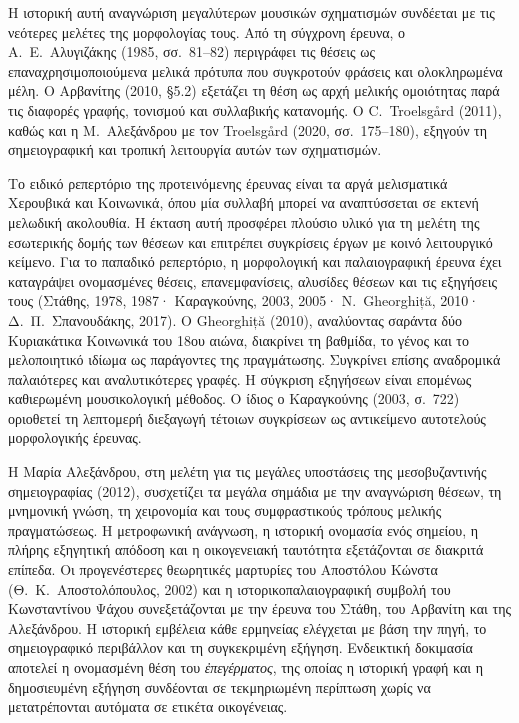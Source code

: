 \documentclass[11pt,a4paper]{article}
\begin{document}
Η ιστορική αυτή αναγνώριση μεγαλύτερων μουσικών σχηματισμών συνδέεται με τις νεότερες μελέτες της μορφολογίας τους. Από τη σύγχρονη έρευνα, ο Α.~Ε.~Αλυγιζάκης (1985, σσ.~81--82) περιγράφει τις θέσεις ως επαναχρησιμοποιούμενα μελικά πρότυπα που συγκροτούν φράσεις και ολοκληρωμένα μέλη. Ο Αρβανίτης (2010, §5.2) εξετάζει τη θέση ως αρχή μελικής ομοιότητας παρά τις διαφορές γραφής, τονισμού και συλλαβικής κατανομής. Ο C.~Troelsgård (2011), καθώς και η Μ.~Αλεξάνδρου με τον Troelsgård (2020, σσ.~175--180), εξηγούν τη σημειογραφική και τροπική λειτουργία αυτών των σχηματισμών.

Το ειδικό ρεπερτόριο της προτεινόμενης έρευνας είναι τα αργά μελισματικά Χερουβικά και Κοινωνικά, όπου μία συλλαβή μπορεί να αναπτύσσεται σε εκτενή μελωδική ακολουθία. Η έκταση αυτή προσφέρει πλούσιο υλικό για τη μελέτη της εσωτερικής δομής των θέσεων και επιτρέπει συγκρίσεις έργων με κοινό λειτουργικό κείμενο. Για το παπαδικό ρεπερτόριο, η μορφολογική και παλαιογραφική έρευνα έχει καταγράψει ονομασμένες θέσεις, επανεμφανίσεις, αλυσίδες θέσεων και τις εξηγήσεις τους (Στάθης, 1978, 1987· Καραγκούνης, 2003, 2005· N.~Gheorghiță, 2010· Δ.~Π.~Σπανουδάκης, 2017). Ο Gheorghiță (2010), αναλύοντας σαράντα δύο Κυριακάτικα Κοινωνικά του 18ου αιώνα, διακρίνει τη βαθμίδα, το γένος και το μελοποιητικό ιδίωμα ως παράγοντες της πραγμάτωσης. Συγκρίνει επίσης αναδρομικά παλαιότερες και αναλυτικότερες γραφές. Η σύγκριση εξηγήσεων είναι επομένως καθιερωμένη μουσικολογική μέθοδος. Ο ίδιος ο Καραγκούνης (2003, σ.~722) οριοθετεί τη λεπτομερή διεξαγωγή τέτοιων συγκρίσεων ως αντικείμενο αυτοτελούς μορφολογικής έρευνας.

Η Μαρία Αλεξάνδρου, στη μελέτη για τις μεγάλες υποστάσεις της μεσοβυζαντινής σημειογραφίας (2012), συσχετίζει τα μεγάλα σημάδια με την αναγνώριση θέσεων, τη μνημονική γνώση, τη χειρονομία και τους συμφραστικούς τρόπους μελικής πραγματώσεως. Η μετροφωνική ανάγνωση, η ιστορική ονομασία ενός σημείου, η πλήρης εξηγητική απόδοση και η οικογενειακή ταυτότητα εξετάζονται σε διακριτά επίπεδα. Οι προγενέστερες θεωρητικές μαρτυρίες του Αποστόλου Κώνστα (Θ.~Κ.~Αποστολόπουλος, 2002) και η ιστορικοπαλαιογραφική συμβολή του Κωνσταντίνου Ψάχου συνεξετάζονται με την έρευνα του Στάθη, του Αρβανίτη και της Αλεξάνδρου. Η ιστορική εμβέλεια κάθε ερμηνείας ελέγχεται με βάση την πηγή, το σημειογραφικό περιβάλλον και τη συγκεκριμένη εξήγηση. Ενδεικτική δοκιμασία αποτελεί η ονομασμένη θέση του \emph{ἐπεγέρματος}, της οποίας η ιστορική γραφή και η δημοσιευμένη εξήγηση συνδέονται σε τεκμηριωμένη περίπτωση χωρίς να μετατρέπονται αυτόματα σε ετικέτα οικογένειας.
\end{document}
